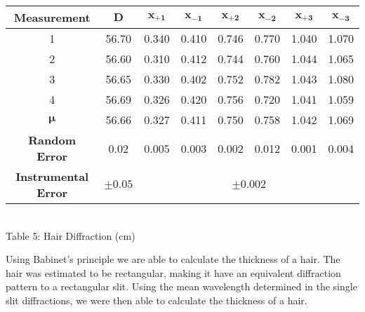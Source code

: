 \begin{center}
    \begin{tabular}{|c|c|c c c c c c|}
        \hline
        \textbf{Measurement} & $\bm{D}$ & $\bm{x_{+1}}$ & $\bm{x_{-1}}$ & $\bm{x_{+2}}$ & $\bm{x_{-2}}$ & $\bm{x_{+3}}$ & $\bm{x_{-3}}$\\ \hline
        1                     & 56.70  & 0.340 & 0.410  & 0.746 & 0.770 & 1.040 & 1.070 \\ 
        2                     & 56.60  & 0.310 & 0.412  & 0.744 & 0.760 & 1.044 & 1.065\\ 
        3                     & 56.65  & 0.330 & 0.402  & 0.752 & 0.782 & 1.043 & 1.080\\ 
        4                     & 56.69  & 0.326 & 0.420  & 0.756 & 0.720 & 1.041 & 1.059\\ \hline \hline
        $\bm{\mu}$            & 56.66  & 0.327 & 0.411  & 0.750 & 0.758 & 1.042 & 1.069\\ 
        \textbf{Random Error} & 0.02   & 0.005 & 0.003  & 0.002 & 0.012 & 0.001 & 0.004\\ 
        \textbf{Instrumental Error} & $\pm 0.05$ & \multicolumn{6}{c|}{$\pm 0.002$} \\ \hline
    \end{tabular}
    \vspace{3mm}
    \\Table 5: Hair Diffraction (cm)\\

\end{center}
Using Babinet's principle we are able to calculate the thickness of a hair. 
The hair was estimated to be rectangular, making it have an equivalent diffraction pattern to a rectangular slit. 
Using the mean wavelength determined in the single slit diffractions, we were then able to calculate the thickness of a hair.
